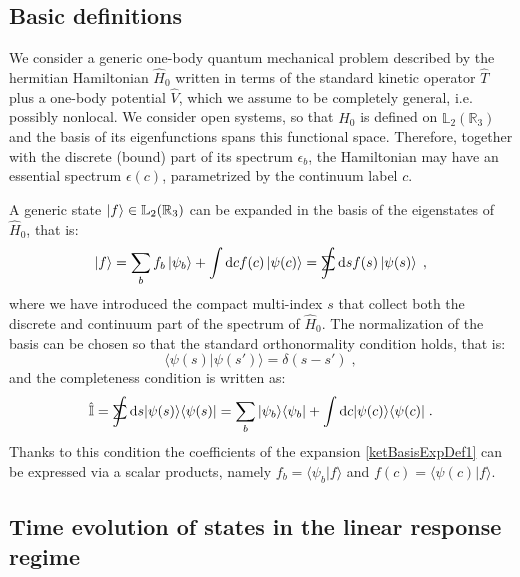 \documentclass[a4paper]{article}
\newcommand{\dd}{{\rm d}}
\newcommand{\eps}{\epsilon}
\newcommand{\sint}{\mathrlap{\displaystyle\int}
\mathrlap{\textstyle\sum}
\phantom{\mathrlap{\displaystyle
\int}\textstyle\sum}}
\newcommand{\be}{\begin{equation}}
\newcommand{\ee}{\end{equation}}
\newcommand{\lb}{\label}
\newcommand{\op}[1]{\hat {#1}}
\newcommand{\brket}[2]{\langle  #1 | #2 \rangle} %
\newcommand{\ketbra}[2]{| #1 \rangle \langle #2 |}
\newcommand{\hnot}{\op{H}_0}
\newcommand{\identity}{\op{\mathbb I}}
\begin{document}
\subsection{Basic definitions}\lb{BasicDef}

We consider a generic one-body quantum mechanical problem described by the hermitian Hamiltonian $\hnot$  written in terms of the standard 
kinetic operator $\op T$ plus a one-body potential $\op V$, which we assume to be completely general, i.e. possibly nonlocal.
We consider open systems, so that $\hnot$ is defined on $\mathbb L_2(\mathbb R_3)$ and the basis of its eigenfunctions spans this 
functional space. Therefore, together with the discrete (bound) part of its spectrum $\eps_b$, the Hamiltonian may have an essential spectrum 
$\eps(c)$, parametrized by the continuum label $c$. 

A generic state $\ket{f} \in \mathbb L_2(\mathbb R_3)$ can be expanded in the basis of the eigenstates of $\hnot$, that is:
\be\lb{ketBasisExpDef1}
\ket{f} = \sum_b f_b \ket{\psi_b} + \int \dd c f(c) \ket{\psi(c)}  = 
\sint \dd s f(s) \ket{\psi(s)} \;,
\ee
where we have introduced the compact multi-index $s$ that collect both the discrete and continuum part of the spectrum of $\hnot$.
The normalization of the basis can be chosen so that the standard orthonormality condition holds, that is: 
\be
\brket{\psi(s)}{\psi(s')} = \delta(s-s') \;,
\ee
and the completeness condition is written as:
\be\lb{completenessH0basis1}
\identity = \sint \dd s \ketbra{\psi(s)}{\psi(s)} = \sum_{b} \ketbra{\psi_b}{\psi_b} + \int \dd c \ketbra{\psi(c)}{\psi(c)} \;. 
\ee
Thanks to this condition the coefficients of the expansion \eqref{ketBasisExpDef1} can be expressed via a scalar products, namely $f_{b} = 
\brket{\psi_b}{f}$ and $f(c) = \brket{\psi(c)}{f}$.

\subsection{Time evolution of states in the linear response regime}
\end{document}
